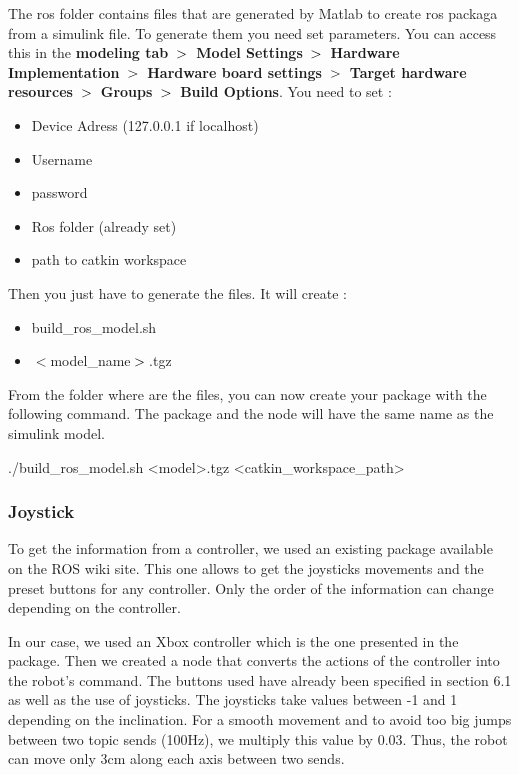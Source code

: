 \bigbreak
The ros folder contains files that are generated by Matlab to create ros packaga from a simulink file. To generate them you need set parameters. You can access this in the \textbf{modeling tab} $\bg$ \textbf{Model Settings} $\bg$ \textbf{Hardware Implementation} $\bg$ \textbf{Hardware board settings} $\bg$ \textbf{Target hardware resources} $\bg$ \textbf{Groups} $\bg$ \textbf{Build Options}. You need to set :
\begin{itemize}[noitemsep]
    \item Device Adress (127.0.0.1 if localhost)
    \item Username
    \item password
    \item Ros folder (already set)
    \item path to catkin workspace
\end{itemize}

\bigbreak
Then you just have to generate the files. It will create :
\begin{multicols}{2}
    \begin{itemize}[noitemsep]
        \item build\_ros\_model.sh
        \item $\less$model\_name$\bg$.tgz
    \end{itemize}
\end{multicols}


\bigbreak
From the folder where are the files, you can now create your package with the following command. The package and the node will have the same name as the simulink model.
\begin{commandshell}
    ./build_ros_model.sh <model>.tgz <catkin_workspace_path>
\end{commandshell} 


\subsubsection{Joystick}

To get the information from a controller, we used an existing package available on the ROS wiki site. This one allows to get the joysticks movements and the preset buttons for any controller. Only the order of the information can change depending on the controller. 

\bigbreak
In our case, we used an Xbox controller which is the one presented in the package. Then we created a node that converts the actions of the controller into the robot's command. The buttons used have already been specified in section 6.1 as well as the use of joysticks. The joysticks take values between -1 and 1 depending on the inclination. For a smooth movement and to avoid too big jumps between two topic sends (100Hz), we multiply this value by 0.03. Thus, the robot can move only 3cm along each axis between two sends.

